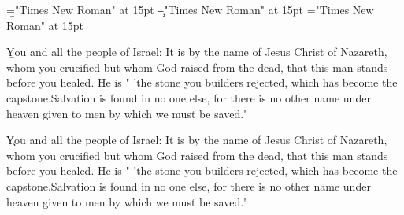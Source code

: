 \documentclass[a4paper]{article}
\begin{document}
 
\pagestyle{plain} 
\font\b="Times New Roman" at 15pt
\font\c="Times New Roman" at 15pt
\font\a="Times New Roman" at 15pt

\pagestyle{fancy} 

\b{You and all the people of Israel: It is by the name of Jesus Christ of Nazareth, whom you crucified but whom God raised from the dead, that this man stands before you healed. He is " 'the stone you builders rejected, which has become the capstone.Salvation is found in no one else, for there is no other name under heaven given to men by which we must be saved." }

\c{You and all the people of Israel: It is by the name of Jesus Christ of Nazareth, whom you crucified but whom God raised from the dead, that this man stands before you healed. He is " 'the stone you builders rejected, which has become the capstone.Salvation is found in no one else, for there is no other name under heaven given to men by which we must be saved." }

\end{document}
